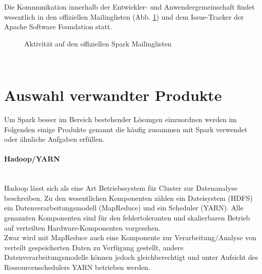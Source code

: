 Die Kommunikation innerhalb der Entwickler- und Anwendergemeinschaft findet wesentlich in den offiziellen Mailinglisten (Abb. \ref{fig:mailinglisten}) und dem Issue-Tracker\cite{issuetracker} der Apache Software Foundation statt.

\begin{figure}[ht!]
	\centering
	\caption{Aktivität auf den offiziellen Spark Mailinglisten}
	\label{fig:mailinglisten}
\end{figure}
\\

\section{Auswahl verwandter Produkte}
Um Spark besser im Bereich bestehender Lösungen einzuordnen werden im Folgenden einige Produkte genannt die häufig zusammen mit Spark verwendet oder ähnliche Aufgaben erfüllen.
\paragraph{Hadoop/YARN}\\
Hadoop lässt sich als eine Art Betriebssystem für Cluster zur Datenanalyse beschreiben. Zu den wesentlichen Komponenten zählen ein Dateisystem (HDFS) ein Datenverarbeitungsmodell (MapReduce) und ein Scheduler (YARN).
Alle genannten Komponenten sind für den fehlertoleranten und skalierbaren Betrieb auf verteilten Hardware-Komponenten vorgesehen.\\
Zwar wird mit MapReduce auch eine Komponente zur Verarbeitung/Analyse von verteilt gespeicherten Daten zu Verfügung gestellt, andere Datenverarbeitungsmodelle können jedoch gleichberechtigt und unter Aufsicht des Ressourcenschedulers YARN betrieben werden.\\

